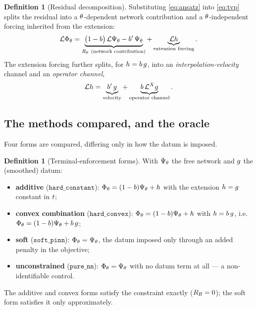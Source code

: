 \documentclass[11pt]{article}
\theoremstyle{plain}
\theoremstyle{definition}
\newtheorem{definition}[theorem]{Definition}
\theoremstyle{remark}
\begin{document}
\begin{definition}[Residual decomposition]\label{def:residual}
Substituting \eqref{eq:ansatz} into \eqref{eq:tvp} splits the residual into a
$\theta$-dependent network contribution and a $\theta$-independent forcing
inherited from the extension:
\begin{equation}\label{eq:residual}
  \mathcal{L}\Phi_{\theta}
  =\underbrace{\bigl(1-b\bigr)\,\mathcal{L}\Psi_{\theta}
      -b'\,\Psi_{\theta}}_{
      R_{\theta}\ (\text{network contribution})}
   +\underbrace{\mathcal{L}h}_{\text{extension forcing}} .
\end{equation}
The extension forcing further splits, for $h=b\,g$, into an
\emph{interpolation-velocity} channel and an \emph{operator channel},
\begin{equation}\label{eq:channels}
  \mathcal{L}h
  =\underbrace{b'\,g}_{\text{velocity}}
   +\underbrace{b\,\mathcal{L}^{X}g}_{\text{operator channel}} .
\end{equation}
\end{definition}

\subsection{The methods compared, and the oracle}\label{sec:methods}

Four forms are compared, differing only in how the datum is imposed.

\begin{definition}[Terminal-enforcement forms]\label{def:forms}
With $\Psi_{\theta}$ the free network and $g$ the (smoothed) datum:
\begin{itemize}
  \item \textbf{additive} ($\mathtt{hard\_constant}$):
    $\Phi_{\theta}=(1-b)\Psi_{\theta}+h$
    with the extension $h=g$ constant in $t$;
  \item \textbf{convex combination} ($\mathtt{hard\_convex}$):
    $\Phi_{\theta}=(1-b)\Psi_{\theta}+h$
    with $h=b\,g$, i.e.\
    $\Phi_{\theta}=(1-b)\Psi_{\theta}+b\,g$;
  \item \textbf{soft} ($\mathtt{soft\_pinn}$): $\Phi_{\theta}=\Psi_{\theta}$,
    the datum imposed only through an added penalty in the objective;
  \item \textbf{unconstrained} ($\mathtt{pure\_nn}$): $\Phi_{\theta}=\Psi_{\theta}$
    with no datum term at all --- a non-identifiable control.
\end{itemize}
The additive and convex forms satisfy the constraint exactly
($R_{\mathcal{B}}=0$); the soft form satisfies it only approximately.
\end{definition}
\end{document}
